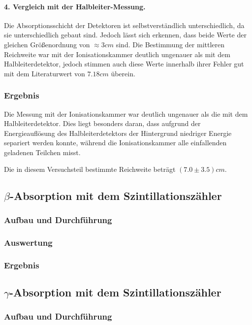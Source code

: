 \documentclass{../Misc/MontavonLaTeX/Montavon}
\begin{document}
\paragraph{4. Vergleich mit der Halbleiter-Messung.}
Die Absorptionsschicht der Detektoren ist selbstverständlich unterschiedlich, da sie unterschiedlich gebaut sind. Jedoch lässt sich erkennen, dass beide Werte der gleichen Größenordnung von $\approx 3 \unit{cm}$ sind. 
Die Bestimmung der mittleren Reichweite war mit der Ionisationskammer deutlich ungenauer als mit dem Halbleiterdetektor, jedoch stimmen auch diese Werte innerhalb ihrer Fehler gut mit dem Literaturwert von $7.18 \unit{cm}$ überein. 

\subsubsection{Ergebnis}
Die Messung mit der Ionisationskammer war deutlich ungenauer als die mit dem Halbleiterdetektor. Dies liegt besonders daran, dass aufgrund der Energieauflösung des Halbleiterdetektors der Hintergrund niedriger Energie separiert werden konnte, während die Ionisationskammer alle einfallenden geladenen Teilchen misst.

Die in diesem Versuchsteil bestimmte Reichweite beträgt $(7.0 \pm 3.5) \unit{cm}$.

\subsection{$\beta$-Absorption mit dem Szintillationszähler}
\subsubsection{Aufbau und Durchführung}
\subsubsection{Auswertung}
\subsubsection{Ergebnis}

\subsection{$\gamma$-Absorption mit dem Szintillationszähler}
\subsubsection{Aufbau und Durchführung}
\end{document}
